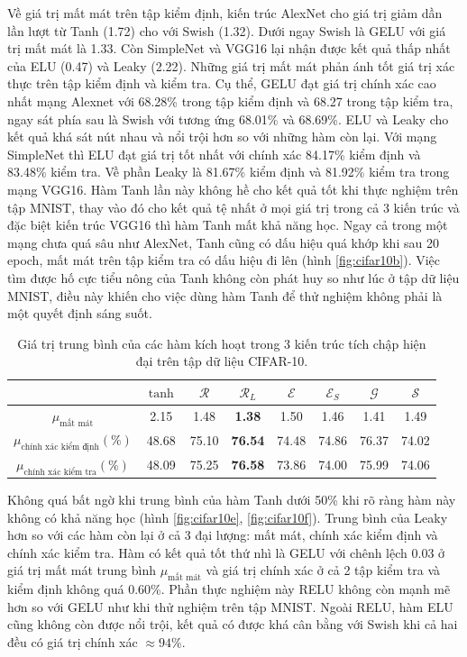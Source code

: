 Về giá trị mất mát trên tập kiểm định, kiến trúc AlexNet cho giá trị giảm dần lần lượt từ Tanh (1.72) cho với Swish (1.32).
Dưới ngay Swish là GELU với giá trị mất mát là 1.33.
Còn SimpleNet và VGG16 lại nhận được kết quả thấp nhất của ELU (0.47) và Leaky (2.22).
Những giá trị mất mát phản ánh tốt giá trị xác thực trên tập kiểm định và kiểm tra.
Cụ thể, GELU đạt giá trị chính xác cao nhất mạng Alexnet với 68.28\% trong tập kiểm định và 68.27 trong tập kiểm tra, ngay sát phía sau là Swish với tương ứng 68.01\% và 68.69\%.
ELU và Leaky cho kết quả khá sát nút nhau và nổi trội hơn so với những hàm còn lại.
Với mạng SimpleNet thì ELU đạt giá trị tốt nhất với chính xác 84.17\% kiểm định và 83.48\% kiểm tra.
Về phần Leaky là 81.67\% kiểm định và 81.92\% kiểm tra trong mạng VGG16.
Hàm Tanh lần này không hề cho kết quả tốt khi thực nghiệm trên tập MNIST, thay vào đó cho kết quả tệ nhất ở mọi giá trị trong cả 3 kiến trúc và đặc biệt kiến trúc VGG16 thì hàm Tanh mất khả năng học.
Ngay cả trong một mạng chưa quá sâu như AlexNet, Tanh cũng có dấu hiệu quá khớp khi sau 20 epoch, mất mát trên tập kiểm tra có dấu hiệu đi lên (hình \ref{fig:cifar10b}).
Việc tìm được hố cực tiểu nông của Tanh không còn phát huy so như lúc ở tập dữ liệu MNIST, điều này khiến cho việc dùng hàm Tanh để thử nghiệm không phải là một quyết định sáng suốt.

\begin{table}[ht!]
\centering
\def\arraystretch{1.5}
\begin{tabular}{c|c|c|c|c|c|c|c|}
\cline{2-8}
                        & $\tanh$      & $\mathcal{R}$      & $\mathcal{R}_L$      & $\mathcal{E}$      & $\mathcal{E}_S$      & $\mathcal{G}$      & $\mathcal{S}$      \\ \hline
\multicolumn{1}{|c|}{$\mu_{\text{mất mát}}$} & 2.15  & 1.48  & \textbf{1.38}  & 1.50   & 1.46  & 1.41  & 1.49  \\ \hline
\multicolumn{1}{|c|}{$\mu_{\text{chính xác kiểm định}} (\%)$} & 48.68 & 75.10 & \textbf{76.54} & 74.48 & 74.86 & 76.37 & 74.02 \\ \hline
\multicolumn{1}{|c|}{$\mu_{\text{chính xác kiểm tra}} (\%)$} & 48.09   & 75.25   & \textbf{76.58}   & 73.86   & 74.00   & 75.99   & 74.06   \\ \hline
\end{tabular}
\caption{Giá trị trung bình của các hàm kích hoạt trong 3 kiến trúc tích chập hiện đại trên tập dữ liệu CIFAR-10.}
\end{table}

Không quá bất ngờ khi trung bình của hàm Tanh dưới 50\% khi rõ ràng hàm này không có khả năng học (hình \ref{fig:cifar10e}, \ref{fig:cifar10f}).
Trung bình của Leaky hơn so với các hàm còn lại ở cả 3 đại lượng: mất mát, chính xác kiểm định và chính xác kiểm tra.
Hàm có kết quả tốt thứ nhì là GELU với chênh lệch 0.03 ở giá trị mất mát trung bình $\mu_{\text{mất mát}}$ và giá trị chính xác ở cả 2 tập kiểm tra và kiểm định không quá 0.60\%.
Phần thực nghiệm này RELU không còn mạnh mẽ hơn so với GELU như khi thử nghiệm trên tập MNIST.
Ngoài RELU, hàm ELU cũng không còn được nổi trội, kết quả có được khá cân bằng với Swish khi cả hai đều có giá trị chính xác $\approx 94\%$.

